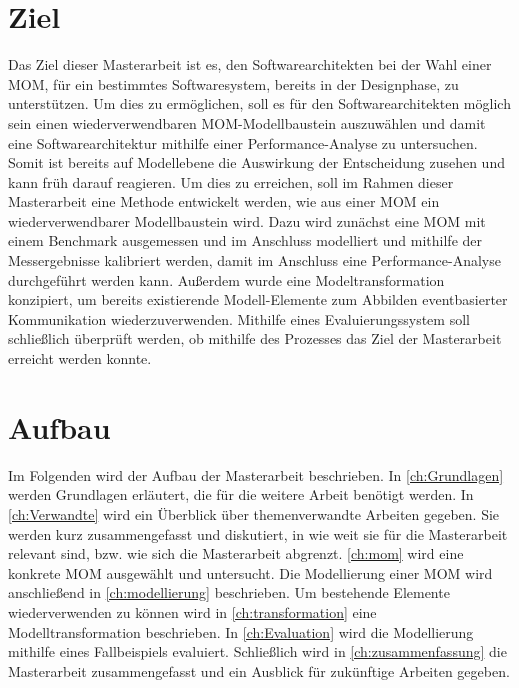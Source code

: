 \section{Ziel}
Das Ziel dieser Masterarbeit ist es, den Softwarearchitekten bei der Wahl einer MOM, für ein bestimmtes  Softwaresystem, bereits in der Designphase, zu unterstützen. Um dies zu ermöglichen, soll es für den Softwarearchitekten möglich sein einen wiederverwendbaren MOM-Modellbaustein auszuwählen und damit eine Softwarearchitektur mithilfe einer Performance-Analyse zu untersuchen. Somit ist bereits auf Modellebene die Auswirkung der Entscheidung zusehen und kann früh darauf reagieren. Um dies zu erreichen, soll im Rahmen dieser Masterarbeit eine Methode entwickelt werden, wie aus einer MOM ein wiederverwendbarer Modellbaustein wird. Dazu wird zunächst eine MOM mit einem Benchmark ausgemessen und im Anschluss modelliert und mithilfe der Messergebnisse kalibriert werden, damit im Anschluss eine Performance-Analyse durchgeführt werden kann. Außerdem wurde eine Modeltransformation konzipiert, um bereits existierende Modell-Elemente zum Abbilden eventbasierter Kommunikation wiederzuverwenden. Mithilfe eines Evaluierungssystem soll schließlich überprüft werden, ob mithilfe des Prozesses das Ziel der Masterarbeit erreicht werden konnte.

\section{Aufbau}
Im Folgenden wird der Aufbau der Masterarbeit beschrieben. In \autoref{ch:Grundlagen} werden Grundlagen erläutert, die für die weitere Arbeit benötigt werden. In \autoref{ch:Verwandte} wird ein Überblick über themenverwandte Arbeiten gegeben. Sie werden kurz zusammengefasst und diskutiert, in
wie weit sie für die Masterarbeit relevant sind, bzw. wie sich die Masterarbeit abgrenzt. \autoref{ch:mom} wird eine konkrete MOM ausgewählt und untersucht. Die Modellierung einer MOM wird anschließend in \autoref{ch:modellierung} beschrieben. Um bestehende Elemente wiederverwenden zu können wird in \autoref{ch:transformation} eine Modelltransformation beschrieben. In \autoref{ch:Evaluation} wird die Modellierung mithilfe eines Fallbeispiels evaluiert. Schließlich wird in \autoref{ch:zusammenfassung} die Masterarbeit zusammengefasst und ein Ausblick für zukünftige Arbeiten gegeben.


